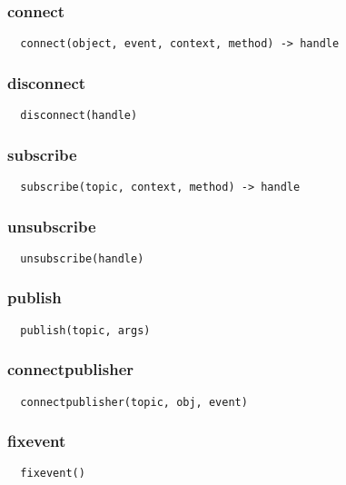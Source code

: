 \subsubsection*{connect}
\begin{verbatim}
  connect(object, event, context, method) -> handle
\end{verbatim}

\subsubsection*{disconnect}
\begin{verbatim}
  disconnect(handle)
\end{verbatim}

\subsubsection*{subscribe}
\begin{verbatim}
  subscribe(topic, context, method) -> handle
\end{verbatim}

\subsubsection*{unsubscribe}
\begin{verbatim}
  unsubscribe(handle)
\end{verbatim}

\subsubsection*{publish}
\begin{verbatim}
  publish(topic, args)
\end{verbatim}

\subsubsection*{connectpublisher}
\begin{verbatim}
  connectpublisher(topic, obj, event)
\end{verbatim}

\subsubsection*{fixevent}
\begin{verbatim}
  fixevent()
\end{verbatim}

